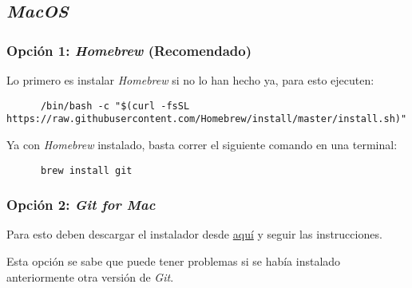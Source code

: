 \subsection{\textit{MacOS}}

  \subsubsection{Opción 1: \textit{Homebrew} (Recomendado)}
    Lo primero es instalar \textit{Homebrew} si no lo han hecho ya, para esto ejecuten:

    \begin{verbatim}
      /bin/bash -c "$(curl -fsSL https://raw.githubusercontent.com/Homebrew/install/master/install.sh)"
    \end{verbatim}

    Ya con \textit{Homebrew} instalado, basta correr el siguiente comando en una terminal:

    \begin{verbatim}
      brew install git
    \end{verbatim}

  \subsubsection{Opción 2: \textit{Git for Mac}}
    Para esto deben descargar el instalador desde 
    \href{https://sourceforge.net/projects/git-osx-installer/}{aquí} y seguir las 
    instrucciones.

    Esta opción se sabe que puede tener problemas si se había instalado anteriormente otra
    versión de \textit{Git}.
%